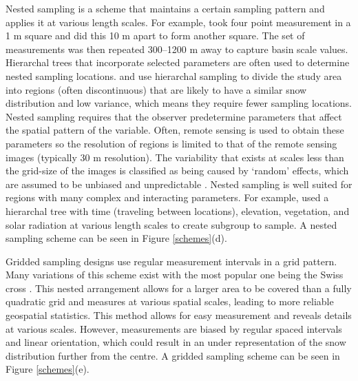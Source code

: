 \documentclass{sfuthesis}
\begin{document}
Nested sampling is a scheme that maintains a certain sampling pattern and applies it at various length scales. For example, \cite{Schweizer2008} took four point measurement in a 1 m square and did this 10 m apart to form another square. The set of measurements was then repeated 300--1200 m away to capture basin scale values. Hierarchal trees that incorporate selected parameters are often used to determine nested sampling locations. \cite{Watson2006} and \cite{Kasurak2011} use hierarchal sampling to divide the study area into regions (often discontinuous) that are likely to have a similar snow distribution and low variance, which means they require fewer sampling locations. Nested sampling requires that the observer predetermine parameters that affect the spatial pattern of the variable. Often, remote sensing is used to obtain these parameters so the resolution of regions is limited to that of the remote sensing images (typically 30 m resolution). The variability that exists at scales less than the grid-size of the images is classified as being caused by `random' effects, which are assumed to be unbiased and unpredictable \citep{Watson2006}. Nested sampling is well suited for regions with many complex and interacting parameters. For example, \cite{Watson2006} used a hierarchal tree with time (traveling between locations), elevation, vegetation, and solar radiation at various length scales to create subgroup to sample.  A nested sampling scheme can be seen in Figure \ref{schemes}(d). 

Gridded sampling designs use regular measurement intervals in a grid pattern. Many variations of this scheme exist \citep{Molotch2005a, Kronholm2007, Lopez2011} with the most popular one being the Swiss cross \citep{Kronholm2004}. This nested arrangement allows for a larger area to be covered than a fully quadratic grid and measures at various spatial scales, leading to more reliable geospatial statistics. This method allows for easy measurement and reveals details at various scales. However, measurements are biased by regular spaced intervals and linear orientation, which could result in an under representation of the snow distribution further from the centre. A gridded sampling scheme can be seen in Figure \ref{schemes}(e). 
\end{document}
